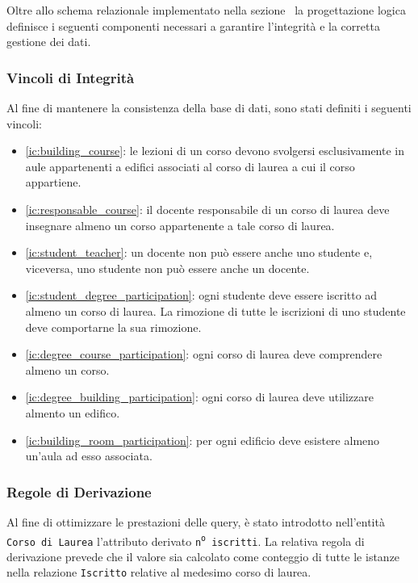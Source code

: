 \documentclass[a4paper,11pt]{article}
\begin{document}
Oltre allo schema relazionale implementato nella sezione~ la progettazione logica definisce i seguenti componenti necessari a garantire l'integrità e la corretta gestione dei dati.


\subsubsection{Vincoli di Integrità}

Al fine di mantenere la consistenza della base di dati, sono stati definiti i seguenti vincoli:

\begin{itemize}
    \item \ref{ic:building_course}: le lezioni di un corso devono svolgersi esclusivamente in aule appartenenti a edifici associati al corso di laurea a cui il corso appartiene.
    \item \ref{ic:responsable_course}: il docente responsabile di un corso di laurea deve insegnare almeno un corso appartenente a tale corso di laurea.
    \item \ref{ic:student_teacher}: un docente non può essere anche uno studente e, viceversa, uno studente non può essere anche un docente.
    \item \ref{ic:student_degree_participation}: ogni studente deve essere iscritto ad almeno un corso di laurea. La rimozione di tutte le iscrizioni di uno studente deve comportarne la sua rimozione.
    \item \ref{ic:degree_course_participation}: ogni corso di laurea deve comprendere almeno un corso.
    \item \ref{ic:degree_building_participation}: ogni corso di laurea deve utilizzare almento un edifico.
    \item \ref{ic:building_room_participation}: per ogni edificio deve esistere almeno un'aula ad esso associata.
\end{itemize}


\subsubsection{Regole di Derivazione}

Al fine di ottimizzare le prestazioni delle query, è stato introdotto nell'entità \texttt{Corso di Laurea} l'attributo derivato \texttt{n\textsuperscript{o} iscritti}. La relativa regola di derivazione prevede che il valore sia calcolato come conteggio di tutte le istanze nella relazione \texttt{Iscritto} relative al medesimo corso di laurea.
\end{document}
